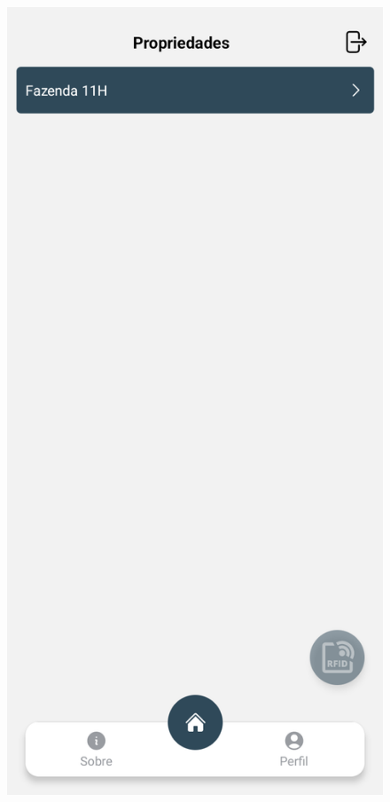 \begin{figure}[H]
    \centering
    \begin{minipage}[b]{0.40\textwidth}
        \centering
        \includegraphics[width=\textwidth]{images/app/rfid-disabled.png}

\end{minipage}
\end{figure}
